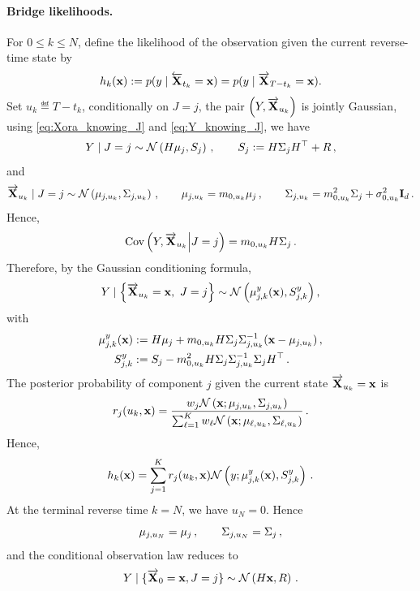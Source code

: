 \documentclass[11pt]{article}
\theoremstyle{plain}
\theoremstyle{definition}
\theoremstyle{remark}
\begin{document}
\paragraph{Bridge likelihoods.}
For $0\le k\le N$, define the likelihood of the observation given the current reverse-time state by
\begin{equation}
\label{eq:num_bridge_likelihood}
h_k(\mathbf{x}) := p(y\mid \overleftarrow{\mathbf{X}}_{t_k}=\mathbf{x}) = p(y\mid \overrightarrow{\mathbf{X}}_{T-t_k}=\mathbf{x}).
\end{equation}
Set $u_k\eqdef T-t_k$, conditionally on $J=j$, the pair $\left(Y,\overrightarrow{\mathbf{X}}_{u_k}\right)$ is jointly Gaussian, using \eqref{eq:Xora_knowing_J} and \eqref{eq:Y_knowing_J}, we have
$$
\Xobs\mid J=j \sim \gaussiand{H\mu_j}{S_j} \eqsp, \qquad S_j\eqdef H\Sigma_jH^\top+R \eqsp,
$$
and
$$
\Xora_{u_k}\mid J=j \sim \gaussiand{\mu_{j,u_k}}{\Sigma_{j,u_k}} \eqsp, 
\qquad \mu_{j,u_k} = m_{0,u_k}\mu_j \eqsp,
\qquad \Sigma_{j,u_k} = m_{0,u_k}^2\Sigma_j+\sigma^2_{0,u_k}\Id_d \eqsp.
$$
Hence,
$$
\operatorname{Cov} \left( Y,\overrightarrow{\mathbf{X}}_{u_k}  \middle| J=j \right)  = m_{0,u_k}H\Sigma_j \, .
$$
Therefore, by the Gaussian conditioning formula,
$$
\Xobs \mid \left\{ \Xora_{u_k}=\x,\ J=j \right\} \sim \gaussiand{\mu^y_{j,k}(\x)}{S^y_{j,k}},
$$
with
\begin{align*}
\mu^y_{j,k}(\mathbf{x}) &:= H\mu_j + m_{0,u_k} H \Sigma_j \Sigma_{j,u_k}^{-1} (\mathbf{x}-\mu_{j,u_k}) \,, \\
S^y_{j,k} &:= S_j - m_{0,u_k}^2 H \Sigma_j \Sigma_{j,u_k}^{-1} \Sigma_jH^\top \,.
\end{align*}
The posterior probability of component $j$ given the current state $\overrightarrow{\mathbf{X}}_{u_k}=\mathbf{x}$ is
$$
r_j(u_k,\x) = \frac{ w_j\gaussiand{\mu_{j,u_k}}{\Sigma_{j,u_k}}[\x] }{ \sum_{\ell=1}^{K} w_\ell \gaussiand{\mu_{\ell,u_k}}{\Sigma_{\ell,u_k}}[\x] } \eqsp.
$$
Hence,
\begin{equation} \label{eq:num_hk_formula}
h_k(\x)  = \sum_{j=1}^{K} r_j(u_k,\x) \gaussiand{\mu^y_{j,k}(\x)}{S^y_{j,k}}[\xobs] \eqsp.
\end{equation}
At the terminal reverse time $k=N$, we have $u_N=0$. Hence
$$
\mu_{j,u_N}=\mu_j \,, \qquad \Sigma_{j,u_N}=\Sigma_j \,,
$$
and the conditional observation law reduces to
$$
\Xobs\mid \{\Xora_0=\x,J=j\} \sim \gaussiand{H\x}{R} \eqsp.
$$
%
%
\end{document}
